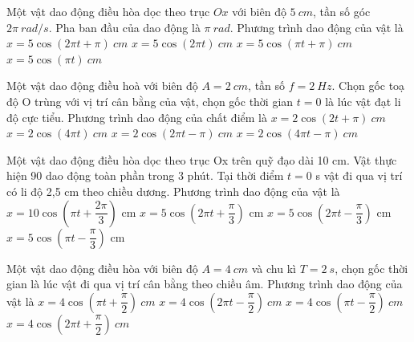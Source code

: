\setcounter{ex}{0}
\setcounter{paragraph}{0}
\PhanI
\begin{ex}
Một vật dao động điều hòa dọc theo trục $Ox$ với biên độ $5\ cm$, tần số góc $2\pi\ rad/s$. Pha ban đầu của dao động là $\pi\ rad$. Phương trình dao động của vật là
\choice
{\True $x=5\cos(2\pi t+\pi)\ cm$}
{$x=5\cos(2\pi t)\ cm$}
{$x=5\cos(\pi t+\pi)\ cm$}
{$x=5\cos(\pi t)\ cm$}
\loigiai{
}
\end{ex}
\begin{ex} %
Một vật dao động điều hoà với biên độ $A = 2\ cm$, tần số $f = 2\ Hz$. Chọn gốc toạ độ O trùng với vị trí cân bằng của vật, chọn gốc thời gian $t = 0$ là lúc vật đạt li độ cực tiểu. Phương trình dao động của chất điểm là
\choice 
{$x = 2\cos\left(2t + \pi\right)\ cm$}
{$x = 2\cos\left(4\pi t\right)\ cm$}
{$x = 2\cos\left(2\pi t - \pi\right)\ cm$}
{\True $x = 2\cos\left(4\pi t - \pi\right)\ cm$}
\end{ex} 

\begin{ex}%
Một vật dao động điều hòa dọc theo trục Ox trên quỹ đạo dài 10 cm. Vật thực hiện 90 dao động toàn phần trong 3 phút. Tại thời điểm $t = 0$ s vật đi qua vị trí có li độ 2,5 cm theo chiều dương. Phương trình dao động của vật là
\choice
{$x=10\cos\left(\pi t+\dfrac{2\pi}{3}\right)$ cm}
{$x=5\cos\left(2\pi t+\dfrac{\pi}{3}\right)$ cm}
{$x=5\cos\left(2\pi t-\dfrac{\pi}{3}\right)$ cm}
{\True $x=5\cos\left(\pi t-\dfrac{\pi}{3}\right)$ cm}
\end{ex} 
\begin{ex}
Một vật dao động điều hòa với biên độ $A = 4\ cm$ và chu kì $T = 2\ s$, chọn gốc thời gian là lúc vật đi qua vị trí cân bằng theo chiều âm. Phương trình dao động của vật là
\choice
{\True $x = 4 \cos \left(\pi t + \dfrac{\pi}{2}\right)\ cm$}
{$x = 4 \cos \left(2 \pi t - \dfrac{\pi}{2}\right)\ cm$}
{$x = 4 \cos \left(\pi t - \dfrac{\pi}{2}\right)\ cm$}
{$x = 4 \cos \left(2 \pi t + \dfrac{\pi}{2}\right)\ cm$}
\loigiai{}
\end{ex}

